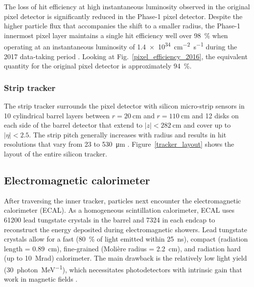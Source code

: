 

The loss of hit efficiency at high instantaneous luminosity observed in the original pixel detector is significantly reduced in the Phase-1 pixel detector. Despite the higher particle flux that accompanies the shift to a smaller radius, the Phase-1 innermost pixel layer maintains a single hit efficiency well over \SI{98}{\percent} when operating at an instantaneous luminosity of \SI{1.4e34}{\cm\tothe{-2}\s\tothe{-1}} during the 2017 data-taking period \cite{phase1_pixel_performance}. Looking at Fig.~\ref{pixel_efficiency_2016}, the equivalent quantity for the original pixel detector is approximately \SI{94}{\percent}.


\subsubsection{Strip tracker}
The strip tracker surrounds the pixel detector with silicon micro-strip sensors in 10 cylindrical barrel layers between $r=\SI{20}{\cm}$ and $r=\SI{110}{\cm}$ and 12 disks on each side of the barrel detector that extend to $|z|<\SI{282}{\cm}$ and cover up to $|\eta|<2.5$. The strip pitch generally increases with radius and results in hit resolutions that vary from \num{23} to \SI{530}{\um} \cite{cms_experiment}. Figure~\ref{tracker_layout} shows the layout of the entire silicon tracker.




\subsection{Electromagnetic calorimeter}
After traversing the inner tracker, particles next encounter the electromagnetic calorimeter (ECAL). As a homogeneous scintillation calorimeter, ECAL uses \num{61200} lead tungstate crystals in the barrel and \num{7324} in each endcap to reconstruct the energy deposited during electromagnetic showers. Lead tungstate crystals allow for a fast (\SI{80}{\percent} of light emitted within \SI{25}{\ns}), compact (radiation length = \SI{0.89}{cm}), fine-grained (Moli\`ere radius = \SI{2.2}{\cm}), and radiation hard (up to \SI{10}{\mega rad}) calorimeter. The main drawback is the relatively low light yield (\SI{30}{photon\per\mega\electronvolt}), which necessitates photodetectors with intrinsic gain that work in magnetic fields \cite{cms_experiment, cms_tdr_v1}.

